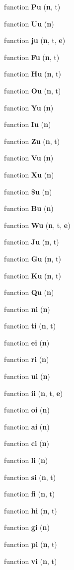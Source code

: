 \begin{DoxyCompactItemize}
function {\bf Pu} ({\bf n}, t)
\item 
function {\bf Uu} ({\bf n})
\item 
function {\bf ju} ({\bf n}, t, {\bf e})
\item 
function {\bf Fu} ({\bf n}, t)
\item 
function {\bf Hu} ({\bf n}, t)
\item 
function {\bf Ou} ({\bf n}, t)
\item 
function {\bf Yu} ({\bf n})
\item 
function {\bf Iu} ({\bf n})
\item 
function {\bf Zu} ({\bf n}, t)
\item 
function {\bf Vu} ({\bf n})
\item 
function {\bf Xu} ({\bf n})
\item 
function {\bf \$u} ({\bf n})
\item 
function {\bf Bu} ({\bf n})
\item 
function {\bf Wu} ({\bf n}, t, {\bf e})
\item 
function {\bf Ju} ({\bf n}, t)
\item 
function {\bf Gu} ({\bf n}, t)
\item 
function {\bf Ku} ({\bf n}, t)
\item 
function {\bf Qu} ({\bf n})
\item 
function {\bf ni} ({\bf n})
\item 
function {\bf ti} ({\bf n}, t)
\item 
function {\bf ei} ({\bf n})
\item 
function {\bf ri} ({\bf n})
\item 
function {\bf ui} ({\bf n})
\item 
function {\bf ii} ({\bf n}, t, {\bf e})
\item 
function {\bf oi} ({\bf n})
\item 
function {\bf ai} ({\bf n})
\item 
function {\bf ci} ({\bf n})
\item 
function {\bf li} ({\bf n})
\item 
function {\bf si} ({\bf n}, t)
\item 
function {\bf fi} ({\bf n}, t)
\item 
function {\bf hi} ({\bf n}, t)
\item 
function {\bf gi} ({\bf n})
\item 
function {\bf pi} ({\bf n}, t)
\item 
function {\bf vi} ({\bf n}, t)
\item 

\end{DoxyCompactItemize}
